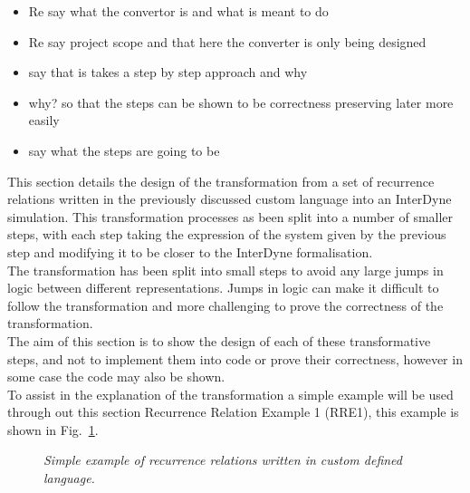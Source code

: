 \documentclass{article}
\begin{document}
\begin{itemize}
  \item Re say what the convertor is and what is meant to do
  \item Re say project scope and that here the converter is only being designed 
  \item say that is takes a step by step approach and why 
  \item why? so that the steps can be shown to be correctness preserving later more easily 
  \item say what the steps are going to be 
\end{itemize}






This section details the design of the transformation from a set of recurrence relations written in the previously discussed custom language into an InterDyne simulation. This transformation processes  as been split into a number of smaller steps, with each step taking the expression of the system given by the previous step and modifying it to be closer to the InterDyne formalisation.\\
The transformation has been split into small steps to avoid any large jumps in logic between different representations. Jumps in logic can make it difficult to follow the transformation and more challenging to prove the correctness of the transformation.\\
The aim of this section is to show the design of each of these transformative steps, and not to implement them into code or prove their correctness, however in some case the code may also be shown.\\
To assist in the explanation of the transformation a simple example will be used through out this section Recurrence Relation Example 1 (RRE1), this example is shown in Fig.~\ref{fig:rre1}. 
\begin{figure}[H]
	\centering
	
	\caption{\it Simple example of recurrence relations written in custom defined language.}
	\label{fig:rre1}
\end{figure} 
\end{document}
